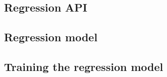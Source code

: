 \documentclass[../main.tex]{subfiles}
\begin{document}


\subsection{Regression API}


\subsection{Regression model}


\subsection{Training the regression model}

\end{document}
